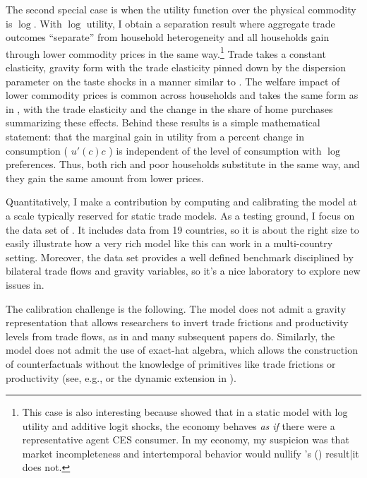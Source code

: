 \documentclass[12pt,pdftex]{article}
\def\citeapos#1{\citeauthor{#1}'s (\citeyear{#1})}
\begin{document}
\begin{onehalfspacing}
The second special case is when the utility function over the physical commodity is $\log$. With $\log$ utility, I obtain a separation result where aggregate trade outcomes ``separate'' from household heterogeneity and all households gain through lower commodity prices in the same way.\footnote{This case is also interesting because \citet{anderson1987ces} showed that in a static model with log utility and additive logit shocks, the economy behaves \emph{as if} there were a representative agent CES consumer. In my economy, my suspicion was that market incompleteness and intertemporal behavior would nullify \citeapos{anderson1987ces} result|it does not.} Trade takes a constant elasticity, gravity form with the trade elasticity pinned down by the dispersion parameter on the taste shocks in a manner similar to \citet{eaton2002technology}. The welfare impact of lower commodity prices is common across households and takes the same form as in \citet{arkolakis2012new}, with the trade elasticity and the change in the share of home purchases summarizing these effects. Behind these results is a simple mathematical statement: that the marginal gain in utility from a percent change in consumption ( $u'(c)c$  ) is independent of the level of consumption with $\log$ preferences. Thus, both rich and poor households substitute in the same way, and they gain the same amount from lower prices.

Quantitatively, I make a contribution by computing and calibrating the model at a scale typically reserved for static trade models. As a testing ground, I focus on the data set of \citet{eaton2002technology}. It includes data from 19 countries, so it is about the right size to easily illustrate how a very rich model like this can work in a multi-country setting. Moreover, the \citet{eaton2002technology} data set provides a well defined benchmark disciplined by bilateral trade flows and gravity variables, so it's a nice laboratory to explore new issues in.

The calibration challenge is the following. The model does not admit a gravity representation that allows researchers to invert trade frictions and productivity levels from trade flows, as in \citet{eaton2002technology} and many subsequent papers do. Similarly, the model does not admit the use of exact-hat algebra, which allows the construction of counterfactuals without the knowledge of primitives like trade frictions or productivity (see, e.g., \citet{costinot2014trade} or the dynamic extension in \citet*{caliendo2015trade}).


\end{onehalfspacing}
\end{document}
